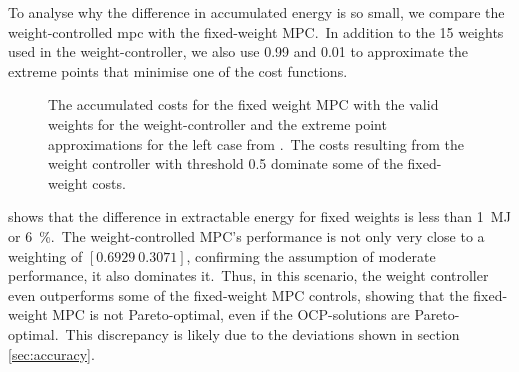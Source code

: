 To analyse why the difference in accumulated energy is so small, we compare the weight-controlled \ac{mpc} with the fixed-weight MPC.\ 
In addition to the 15 weights used in the weight-controller, we also use 0.99 and 0.01 to approximate the extreme points that minimise one of the cost functions.\ 
\begin{figure}[htb]
	\centering
	\fontsize{8}{0}\selectfont
	\def\svgwidth{0.49\textwidth}
	
	\caption{The accumulated costs for the fixed weight MPC with the valid weights for the weight-controller and the extreme point approximations for the left case from .\ The costs resulting from the weight controller with threshold 0.5 dominate some of the fixed-weight costs.}
	\label{fig:mpc_pf}
\end{figure}

 shows that the difference in extractable energy for fixed weights is less than \SI{1}{\mega\joule} or \SI{6}{\percent}.\ 
The weight-controlled MPC's performance is not only very close to a weighting of $[0.6929 \ 0.3071]$, confirming the assumption of moderate performance, it also dominates it.\ 
Thus, in this scenario, the weight controller even outperforms some of the fixed-weight MPC controls, showing that the fixed-weight MPC is not Pareto-optimal, even if the OCP-solutions are Pareto-optimal.\ 
This discrepancy is likely due to the deviations shown in section \ref{sec:accuracy}.
 
\begin{figure*}[hbt]
	\centering
	\fontsize{8}{0}\selectfont
	\def\svgwidth{0.97\textwidth}
	
	\caption{Evaluation of the \ac{mpc} with weight controller for three wave scenarios and two target damage values.\ For clarity, only every 100th value is displayed. Top: Accumulated damage over time. Middle: The selected weight index \iw over time. A lower index corresponds to a higher weighting for the damage cost. Bottom: Extracted energy over time. For the lower damage thresholds, the extracted energy reduces only by 0.09, 0.05, and \SI{0.06}{\mega\joule} for the three cases, respectively.}
	\label{fig:weight_control}
\end{figure*}